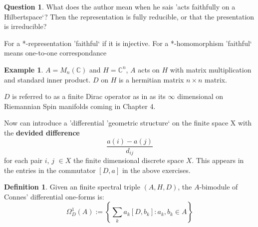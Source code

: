 \documentclass[a4paper]{article}
\newcounter{exercise}
\theoremstyle{definition}
\newtheorem{definition}{Definition}
\theoremstyle{definition}
\newtheorem{question}{Question}
\theoremstyle{definition}
\newtheorem{example}{Example}
\theoremstyle{theorem}
\theoremstyle{theorem}
\begin{document}
\begin{question}
    What does the author mean when he sais 'acts faithfully on a
    Hilbertspace`? Then the representation is fully reducible, or that the
    presentation is irreducible?
    \newline

    For a *-representation 'faithful` if it is injective. For a
    *-homomorphism 'faithful` means one-to-one correspondance
\end{question}

\begin{example}
    $A = M_n(\mathbb{C})$ and $H=\mathbb{C}^n$, $A$ acts on $H$ with matrix
    multiplication and standard inner product. $D$ on $H$ is a hermitian
    matrix $n\times n$ matrix.
\end{example}

$D$ is referred to as a finite Dirac operator as in as its $\infty$
dimensional on Riemannian Spin manifolds coming in Chapter 4.
\newline

Now can introduce a 'differential 'geometric structure` on the finite space X
with the \textbf{devided difference}
\begin{equation}
    \frac{a(i)-a(j)}{d_{ij}}
\end{equation}
for each pair $i$, $j$ $\in X$ the finite dimensional discrete space $X$.
This appears in the entries in the commutator $[D, a]$ in the above
exercises.

\begin{definition}
    Given an finite spectral triple $(A, H, D)$, the $A$-bimodule of
    Connes' differential one-forms is:
    \begin{equation}
        \Omega _D ^1 (A) := \left\{ \sum _k a_k[D, b_k]: a_k, b_k \in A \right\}
    \end{equation}
\end{definition}
\end{document}
